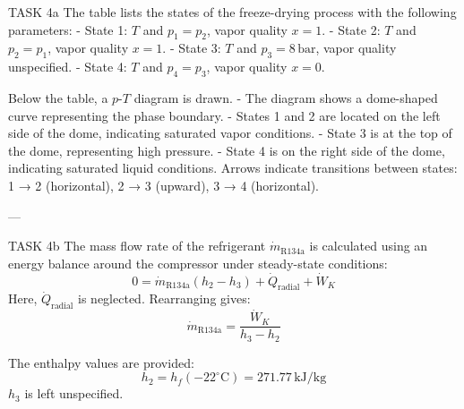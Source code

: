 TASK 4a  
The table lists the states of the freeze-drying process with the following parameters:  
- State 1: \( T \) and \( p_1 = p_2 \), vapor quality \( x = 1 \).  
- State 2: \( T \) and \( p_2 = p_1 \), vapor quality \( x = 1 \).  
- State 3: \( T \) and \( p_3 = 8 \, \text{bar} \), vapor quality unspecified.  
- State 4: \( T \) and \( p_4 = p_3 \), vapor quality \( x = 0 \).  

Below the table, a \( p \)-\( T \) diagram is drawn.  
- The diagram shows a dome-shaped curve representing the phase boundary.  
- States 1 and 2 are located on the left side of the dome, indicating saturated vapor conditions.  
- State 3 is at the top of the dome, representing high pressure.  
- State 4 is on the right side of the dome, indicating saturated liquid conditions.  
Arrows indicate transitions between states:  
1 → 2 (horizontal), 2 → 3 (upward), 3 → 4 (horizontal).

---

TASK 4b  
The mass flow rate of the refrigerant \( \dot{m}_{\text{R134a}} \) is calculated using an energy balance around the compressor under steady-state conditions:  
\[
0 = \dot{m}_{\text{R134a}} \left( h_2 - h_3 \right) + \dot{Q}_{\text{radial}} + \dot{W}_K
\]  
Here, \( \dot{Q}_{\text{radial}} \) is neglected. Rearranging gives:  
\[
\dot{m}_{\text{R134a}} = \frac{\dot{W}_K}{h_3 - h_2}
\]  

The enthalpy values are provided:  
\[
h_2 = h_f(-22^\circ\text{C}) = 271.77 \, \text{kJ/kg}
\]  
\( h_3 \) is left unspecified.